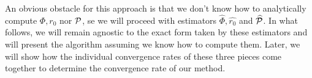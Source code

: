 An obvious obstacle for this approach is that we don't know how to analytically compute $ \Phi, r_{ 0 } $ nor $ \mathcal{P} $, se we will proceed with estimators $ \hat{ \Phi }, \hat{ r_{ 0 } } $ and $ \widehat{ \mathcal{P} } $.
In what follows, we will remain agnostic to the exact form taken by these estimators and will present the algorithm assuming we know how to compute them.
Later, we will show how the individual convergence rates of these three pieces come together to determine the convergence rate of our method.
